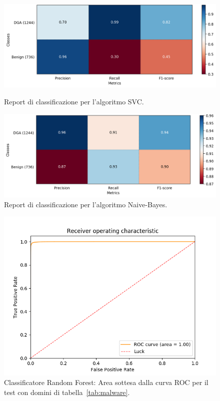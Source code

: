 \begin{figure}[!bp]
  	\centering
    \includegraphics[width=\columnwidth]{figures/report_SVC.png}
    \caption{Report di classificazione per l'algoritmo SVC.\label{fig:repsvc}}
	\hfill
	\vspace{3cm}
	\centering
    \includegraphics[width=\columnwidth]{figures/report_GaussianNB.png}
    \caption{Report di classificazione per l'algoritmo Naive-Bayes.\label{fig:repgnb}}
\end{figure}

\begin{figure}[!bp]
    \centering
    \includegraphics[width=\columnwidth]{figures/rndf_tra_nosup_nosup/roc_plot.png}
    \caption{Classificatore Random Forest: Area sottesa dalla curva ROC per il test con domini di tabella~\ref{tab:malware}.\label{fig:rocdga}}
\end{figure}

